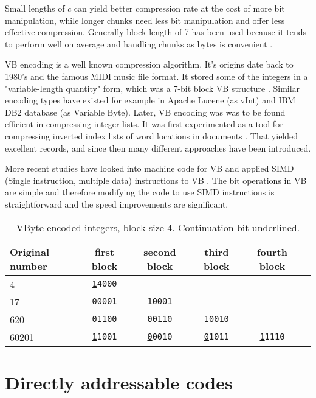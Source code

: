 Small lengths of $c$ can yield better compression rate at the cost of more bit manipulation, while longer chunks need less bit manipulation and 
offer less effective compression. Generally block length of 7 has been used because it tends to perform well on average and handling chunks as bytes is 
convenient \citep{Man08}.

VB encoding is a well known compression algorithm. It's origins date back to 1980's and the famous MIDI music file format. It stored some of the integers
in a "variable-length quantity" form, which was a 7-bit block VB structure \citep{Mid96}. Similar encoding types have existed for example in Apache Lucene 
(as vInt) and IBM DB2 database (as Variable Byte). Later, VB encoding was was to be found efficient in compressing integer lists. It was first experimented 
as a tool for compressing inverted index lists of word locations in documents \citep{Sch02}. That yielded excellent records, and since then many different 
approaches have been introduced. 

More recent studies have looked into machine code for VB and applied SIMD (Single instruction, multiple data) instructions to VB \citep{Lem18,Pla15}. The bit 
operations in VB are simple and therefore modifying the code to use SIMD instructions is straightforward and the speed improvements are significant. 

\begin{table}
\centering
\begin{tabular}{l||c c c c c} 
Original number & first block & second block & third block & fourth block &\\ 
\hline \hline 
4  & \texttt{\underline{1}4000}    &                             &                           &  &  \\
17  & \texttt{\underline{0}0001}   & \texttt{\underline{1}0001}  &                           &  &  \\
620  & \texttt{\underline{0}1100}  & \texttt{\underline{0}0110} & \texttt{\underline{1}0010} &  &  \\
60201 & \texttt{\underline{1}1001} & \texttt{\underline{0}0010} & \texttt{\underline{0}1011} & \texttt{\underline{1}1110} &  \\

\hline
\end{tabular}
\caption{VByte encoded integers, block size 4. Continuation bit underlined.\label{table:vbytes}}
\end{table}


\chapter{Directly addressable codes} \label{chapter:DAC}


